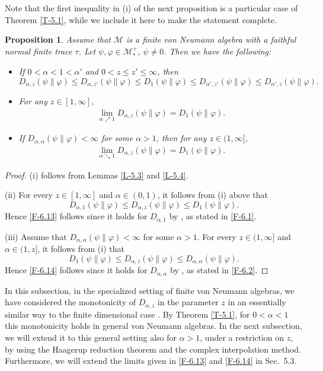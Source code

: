 \documentclass[12pt]{article}
\newtheorem{prop}[theorem]{Proposition}
\theoremstyle{definition}
\theoremstyle{remark}
\numberwithin{equation}{section}
\def\Me{\mathcal M}
\def\ffi{\varphi}
\begin{document}
Note that the first inequality in (i) of the next proposition is a particular case of
Theorem \ref{T-5.1}, while we include it here to make the statement complete.

\begin{prop}\label{P-5.5}
Assume that $\Me$ is a finite von Neumann algebra with a faithful normal finite trace $\tau$.
Let $\psi,\ffi\in\Me_*^+$, $\psi\ne0$. Then we have the following:
\begin{itemize}
\item[(i)] If $0<\alpha<1<\alpha'$ and $0<z\le z'\le\infty$, then
\[
D_{\alpha,z}(\psi\|\ffi)\le D_{\alpha,z'}(\psi\|\ffi)\le D_1(\psi\|\ffi)
\le D_{\alpha',z'}(\psi\|\ffi)\le D_{\alpha',z}(\psi\|\ffi).
\]
\item[(ii)] For any $z\in[1,\infty]$,
\begin{align}\label{F-6.13}
\lim_{\alpha\nearrow1}D_{\alpha,z}(\psi\|\ffi)=D_1(\psi\|\ffi).
\end{align}
\item[(iii)] If $D_{\alpha,\alpha}(\psi\|\ffi)<\infty$ for some $\alpha>1$, then for any $z\in(1,\infty]$,
\begin{align}\label{F-6.14}
\lim_{\alpha\searrow1}D_{\alpha,z}(\psi\|\ffi)=D_1(\psi\|\ffi).
\end{align}
\end{itemize}
\end{prop}

\begin{proof}
(i) follows from Lemmas \ref{L-5.3} and \ref{L-5.4}.

(ii)\enspace
For every $z\in[1,\infty]$ and $\alpha\in(0,1)$, it follows from (i) above that
\[
D_{\alpha,1}(\psi\|\ffi)\le D_{\alpha,z}(\psi\|\ffi)\le D_1(\psi\|\ffi).
\]
Hence \eqref{F-6.13} follows since it holds for $D_{\alpha,1}$ by
\cite[Proposition 5.3(3)]{hiai2018quantum}, as stated in \eqref{F-6.1}.

(iii)\enspace
Assume that $D_{\alpha,\alpha}(\psi\|\ffi)<\infty$ for some $\alpha>1$. For every $z\in(1,\infty]$
and $\alpha\in(1,z]$, it follows from (i) that
\[
D_1(\psi\|\ffi)\le D_{\alpha,z}(\psi\|\ffi)\le D_{\alpha,\alpha}(\psi\|\ffi).
\]
Hence \eqref{F-6.14} follows since it holds for $D_{\alpha,\alpha}$ by
\cite[Proposition 3.8(ii)]{jencova2018renyi}, as stated in \eqref{F-6.2}.
\end{proof}

In this subsection, in the specialized setting of finite von Neumann algebras, we have considered the
monotonicity of $D_{\alpha,z}$ in the parameter $z$ in an essentially similar way to the finite dimensional
case \cite{lin2015investigating,mosonyi2023somecontinuity}. By Theorem
\ref{T-5.1}, for $0<\alpha<1$ this monotonicity holds in general von Neumann algebras. In the next
subsection, we will extend it to this general setting also for $\alpha>1$, under a
restriction on $z$, by using the Haagerup reduction theorem and the complex interpolation method. Furthermore,
we will extend the  limits given in \eqref{F-6.13} and \eqref{F-6.14} in Sec.~5.3.
\end{document}

